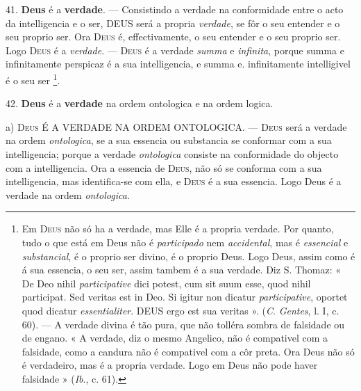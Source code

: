  41. \textbf{Deus} é a \textbf{verdade}. --- Consistindo a verdade na conformidade entre o acto da intelligencia e o ser, \textsc{DEUS} será a propria \emph{verdade}, se fôr o seu entender e o seu proprio ser. Ora \textsc{Deus} é, effectivamente, o seu entender e o seu proprio ser. Logo \textsc{Deus} é a \emph{verdade}. --- \textsc{Deus} é a verdade \emph{summa} e \emph{infinita}, porque summa e infinitamente perspicaz é a sua intelligencia, e summa e. infinitamente intelligivel é o seu ser \footnote{Em \textsc{Deus} não só ha a verdade, mas Elle é a propria verdade. Por quanto, tudo o que está em Deus não é \emph{participado} nem \emph{accidental}, mas é \emph{essencial} e \emph{substancial}, é o proprio ser divino, é o proprio Deus. Logo Deus, assim como é á sua essencia, o seu ser, assim tambem é a sua verdade. Diz S. Thomaz: « De Deo nihil \emph{participative} dici potest, cum sit suum esse, quod nihil participat. Sed veritas est in Deo. Si igitur non dicatur \emph{participative}, oportet quod dicatur \emph{essentialiter}. \textsc{DEUS} ergo est sua veritas ». (\emph{C}. \emph{Gentes}, l. I, c. 60). --- A verdade divina é tão pura, que não tolléra sombra de falsidade ou de engano. « A verdade, diz o mesmo Angelico, não é compativel com a falsidade, como a candura não é compativel com a côr preta. Ora Deus não só é verdadeiro, mas é a propria verdade. Logo em Deus não pode haver falsidade » (\emph{Ib}., c. 61).}.

42. \textbf{Deus} é a \textbf{verdade} na ordem ontologica e na ordem logica.

a) \textsc{Deus} É A VERDADE NA ORDEM ONTOLOGICA. --- \textsc{Deus} será a verdade na ordem \emph{ontologica}, se a sua essencia ou substancia se conformar com a sua intelligencia; porque a verdade \emph{ontologica} consiste na conformidade do objecto com a intelligencia. Ora a essencia de \textsc{Deus}, não só se conforma com a sua intelligencia, mas identifica-se com ella, e \textsc{Deus} é a sua essencia. Logo Deus é a verdade na ordem \emph{ontologica}.

